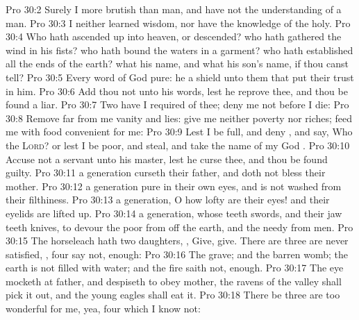 \vs Pro 30:2 Surely I  more brutish than  man, and have not the understanding of a man.
\vs Pro 30:3 I neither learned wisdom, nor have the knowledge of the holy.
\vs Pro 30:4 Who hath ascended up into heaven, or descended? who hath gathered the wind in his fists? who hath bound the waters in a garment? who hath established all the ends of the earth? what  his name, and what  his son's name, if thou canst tell?
\vs Pro 30:5 Every word of God  pure: he  a shield unto them that put their trust in him.
\vs Pro 30:6 Add thou not unto his words, lest he reprove thee, and thou be found a liar.
\vs Pro 30:7 Two  have I required of thee; deny me  not before I die:
\vs Pro 30:8 Remove far from me vanity and lies: give me neither poverty nor riches; feed me with food convenient for me:
\vs Pro 30:9 Lest I be full, and deny , and say, Who  the \textsc{Lord}? or lest I be poor, and steal, and take the name of my God .
\vs Pro 30:10 Accuse not a servant unto his master, lest he curse thee, and thou be found guilty.
\vs Pro 30:11  a generation  curseth their father, and doth not bless their mother.
\vs Pro 30:12  a generation  pure in their own eyes, and  is not washed from their filthiness.
\vs Pro 30:13  a generation, O how lofty are their eyes! and their eyelids are lifted up.
\vs Pro 30:14  a generation, whose teeth  swords, and their jaw teeth  knives, to devour the poor from off the earth, and the needy from  men.
\vs Pro 30:15 The horseleach hath two daughters, , Give, give. There are three  are never satisfied, , four  say not,  enough:
\vs Pro 30:16 The grave; and the barren womb; the earth  is not filled with water; and the fire  saith not,  enough.
\vs Pro 30:17 The eye  mocketh at  father, and despiseth to obey  mother, the ravens of the valley shall pick it out, and the young eagles shall eat it.
\vs Pro 30:18 There be three  are too wonderful for me, yea, four which I know not:
